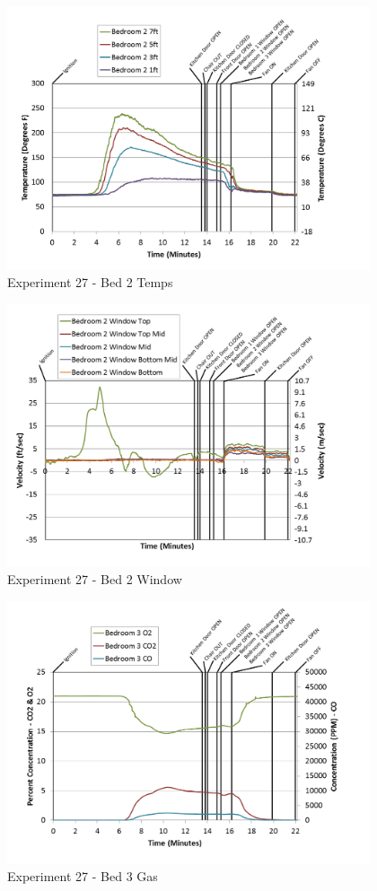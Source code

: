 \documentclass{article}
\begin{document}
\begin{appendices}
\begin{figure}[h!]
	\centering
	\includegraphics[height=3.05in]{0_Images/Results_Charts/Exp_27_Charts/Bed2Temps.png}
	\caption{Experiment 27 - Bed 2 Temps}
\end{figure}

\clearpage

\begin{figure}[h!]
	\centering
	\includegraphics[height=3.05in]{0_Images/Results_Charts/Exp_27_Charts/Bed2Window.png}
	\caption{Experiment 27 - Bed 2 Window}
\end{figure}


\begin{figure}[h!]
	\centering
	\includegraphics[height=3.05in]{0_Images/Results_Charts/Exp_27_Charts/Bed3Gas.png}
	\caption{Experiment 27 - Bed 3 Gas}
\end{figure}


\end{appendices}
\end{document}
